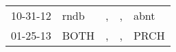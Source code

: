 \begin{supertabular}{lllll}
 10-31-12 &  rndb &  , &  , &  abnt \\
 01-25-13 &  BOTH &  , &  , &  PRCH \\
\end{supertabular}
